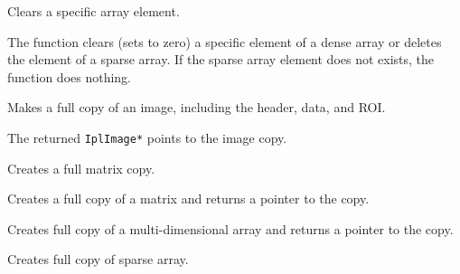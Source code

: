 Clears a specific array element.

\begin{description}
\end{description}

The function  clears (sets to zero) a specific element of a dense array or deletes the element of a sparse array. If the sparse array element does not exists, the function does nothing.

Makes a full copy of an image, including the header, data, and ROI.


\begin{description}
\end{description}

The returned \texttt{IplImage*} points to the image copy.

Creates a full matrix copy.


\begin{description}
\end{description}

Creates a full copy of a matrix and returns a pointer to the copy.

Creates full copy of a multi-dimensional array and returns a pointer to the copy.


\begin{description}
\end{description}


\ifC %
Creates full copy of sparse array.


\begin{description}
\end{description}

